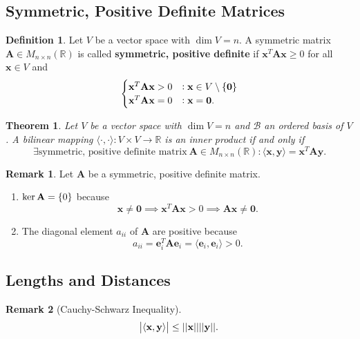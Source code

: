 \documentclass[12pt,openany]{book}
\newtheorem{theorem}{Theorem}[chapter]
\theoremstyle{definition}
\newtheorem{definition}{Definition}[chapter]
\newtheorem{remark}{Remark}[chapter]
\newcommand{\R}{\mathbb{R}}
\newcommand{\by}{\times}
\newcommand{\basis}{\mathscr{B}}
\newcommand{\inner}[1]{\langle #1\rangle}
\newcommand{\norms}[1]{|| #1||}
\begin{document}
	\subsection{Symmetric, Positive Definite Matrices}
	\begin{tcolorbox}[colframe=defcolor,title={\color{white}\bf Symmetric, Positive Defintie Matrix}]
		\begin{definition}
			Let \(V\) be a vector space with \(\dim V=n\). A symmetric matrix \(\textbf{A}\in M_{n\by n}(\R)\) is called \textbf{symmetric, positive definite} if \(\textbf{x}^T\textbf{Ax}\geq 0\) for all \(\textbf{x}\in V\) and \[
			\begin{cases}
				\textbf{x}^T\textbf{Ax}>0 &:\textbf{x}\in V\setminus\set{\textbf{0}}\\
				\textbf{x}^T\textbf{Ax}=0 &:\textbf{x}=\textbf{0}.
			\end{cases}
			\]
		\end{definition}
	\end{tcolorbox}
	\vspace{8pt}
	\begin{tcolorbox}[colframe=thmcolor,title={\color{white}\bf }]
		\begin{theorem}
			Let \(V\) be a vector space with \(\dim V=n\) and \(\basis\) an ordered basis of \(V\). A bilinear mapping \(\inner{\cdot,\cdot}:V\times V\to\R\) is an inner product if and only if \[
			\exists\text{symmetric, positive definite matrix}\ \textbf{A}\in M_{n\by n}(\R):\inner{\textbf{x},\textbf{y}}=\textbf{x}^T\textbf{A}\textbf{y}.
			\]
		\end{theorem}
	\end{tcolorbox} 
	\vspace{8pt}
	\begin{remark}
		Let \(\textbf{A}\) be a symmetric, positive definite matrix.
		\begin{enumerate}[(1)]
			\item \(\ker\textbf{A}=\set{0}\) because \[
			\textbf{x}\neq \textbf{0}\implies \textbf{x}^T\textbf{Ax}>0\implies \textbf{Ax}\neq\textbf{0}.
			\]
			\item The diagonal element \(a_{ii}\) of \(\textbf{A}\) are positive because \[
			a_{ii}=\textbf{e}_i^T\textbf{A}\textbf{e}_i=\inner{\textbf{e}_i,\textbf{e}_i}> 0.
			\]
		\end{enumerate}
	\end{remark}

	\subsection{Lengths and Distances}
	\begin{remark}[Cauchy-Schwarz Inequality]
		\[
		\abs{\inner{\textbf{x},\textbf{y}}}\leq\norms{\textbf{x}}\norms{\textbf{y}}.
		\]
	\end{remark}
	
\end{document}
